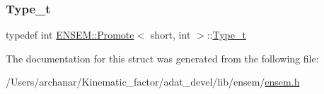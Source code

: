 \subsubsection{\texorpdfstring{Type\_t}{Type\_t}\hspace{0.1cm}{\footnotesize\ttfamily [2/2]}}
{\footnotesize\ttfamily typedef int \mbox{\hyperlink{structENSEM_1_1Promote}{E\+N\+S\+E\+M\+::\+Promote}}$<$ short, int $>$\+::\mbox{\hyperlink{structENSEM_1_1Promote_3_01short_00_01int_01_4_a6fb77c2428a4d51c4da789877c5a6e28}{Type\+\_\+t}}}



The documentation for this struct was generated from the following file\+:\begin{DoxyCompactItemize}
\item 
/\+Users/archanar/\+Kinematic\+\_\+factor/adat\+\_\+devel/lib/ensem/\mbox{\hyperlink{lib_2ensem_2ensem_8h}{ensem.\+h}}\end{DoxyCompactItemize}
